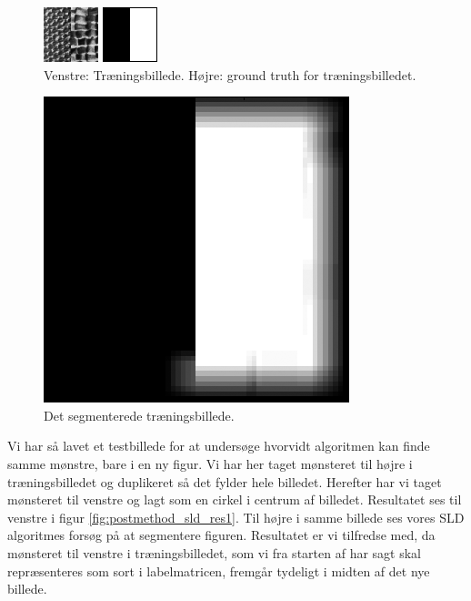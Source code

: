 \begin{figure}[H]
	\begin{minipage}[b]{0.5\linewidth}
		\centering
		\includegraphics[scale=3]{files/postmethod/img/imTrain.png}
	\end{minipage}
	\hspace{0.5cm}
	\begin{minipage}[b]{0.5\linewidth}
		\centering
		\includegraphics[scale=3]{files/postmethod/img/imGT.png}
	\end{minipage}
	\caption{Venstre: Træningsbillede. Højre: ground truth for træningsbilledet.\label{fig:postmethod_sld_train1}}
\end{figure}

\begin{figure}[H]
		\centering
		\includegraphics[scale=0.54]{files/postmethod/img/sld_preres1.png}
	\caption{Det segmenterede træningsbillede.\label{fig:postmethod_sld_label1}}
\end{figure}

Vi har så lavet et testbillede for at undersøge hvorvidt algoritmen kan finde samme mønstre, bare i en ny figur. Vi har her taget mønsteret til højre i træningsbilledet og duplikeret så det fylder hele billedet. Herefter har vi taget mønsteret til venstre og lagt som en cirkel i centrum af billedet. Resultatet ses til venstre i figur \ref{fig:postmethod_sld_res1}. Til højre i samme billede ses vores SLD algoritmes forsøg på at segmentere figuren. Resultatet er vi tilfredse med, da mønsteret til venstre i træningsbilledet, som vi fra starten af har sagt skal repræsenteres som sort i labelmatricen, fremgår tydeligt i midten af det nye billede.

